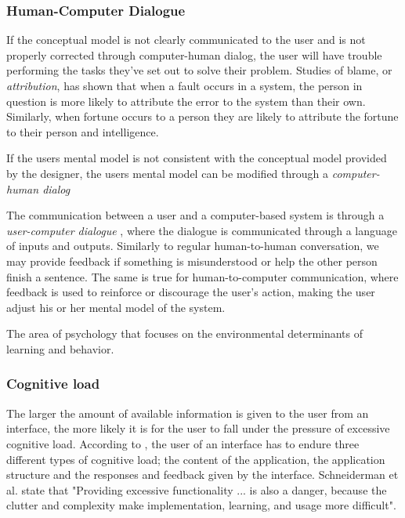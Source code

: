 \subsubsection{Human-Computer Dialogue}

If the conceptual model is not clearly communicated to the user and is not properly corrected through computer-human dialog, the user will have trouble performing the tasks they've set out to solve their problem. Studies of blame, or \textit{attribution}, has shown that when a fault occurs in a system, the person in question is more likely to attribute the error to the system than their own. Similarly, when fortune occurs to a person they are likely to attribute the fortune to their person and intelligence.

If the users mental model is not consistent with the conceptual model provided by the designer, the users mental model can be modified through a \textit{computer-human dialog}

The communication between a user and a computer-based system is through a \textit{user-computer dialogue} \cite{Foley1996}, where the dialogue is communicated through a language of inputs and outputs. Similarly to regular human-to-human conversation, we may provide feedback if something is misunderstood or help the other person finish a sentence. The same is true for human-to-computer communication, where feedback is used to reinforce or discourage the user's action, making the user adjust his or her mental model of the system.

The area of psychology that focuses on the environmental determinants of learning and behavior.

\subsubsection{Cognitive load}
The larger the amount of available information is given to the user from an interface, the more likely it is for the user to fall under the pressure of excessive cognitive load. According to \cite{Jih1992}, the user of an interface has to endure three different types of cognitive load; the content of the application, the application structure and the responses and feedback given by the interface. Schneiderman et al. state that "Providing excessive functionality ... is also a danger, because the clutter and complexity make implementation, learning, and usage more difficult".

